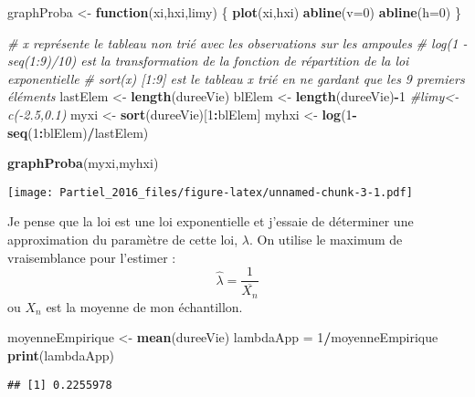 \documentclass[]{article}
\newenvironment{Shaded}{\begin{snugshade}}{\end{snugshade}}
\newcommand{\KeywordTok}[1]{\textcolor[rgb]{0.13,0.29,0.53}{\textbf{#1}}}
\newcommand{\DataTypeTok}[1]{\textcolor[rgb]{0.13,0.29,0.53}{#1}}
\newcommand{\DecValTok}[1]{\textcolor[rgb]{0.00,0.00,0.81}{#1}}
\newcommand{\StringTok}[1]{\textcolor[rgb]{0.31,0.60,0.02}{#1}}
\newcommand{\CommentTok}[1]{\textcolor[rgb]{0.56,0.35,0.01}{\textit{#1}}}
\newcommand{\ControlFlowTok}[1]{\textcolor[rgb]{0.13,0.29,0.53}{\textbf{#1}}}
\newcommand{\OperatorTok}[1]{\textcolor[rgb]{0.81,0.36,0.00}{\textbf{#1}}}
\newcommand{\NormalTok}[1]{#1}
\begin{document}
\begin{Shaded}
\begin{Highlighting}[]
\NormalTok{graphProba <-}\StringTok{ }\ControlFlowTok{function}\NormalTok{(xi,hxi,limy)}
\NormalTok{\{}
  \KeywordTok{plot}\NormalTok{(xi,hxi)}
  \KeywordTok{abline}\NormalTok{(}\DataTypeTok{v=}\DecValTok{0}\NormalTok{)}
  \KeywordTok{abline}\NormalTok{(}\DataTypeTok{h=}\DecValTok{0}\NormalTok{)}
\NormalTok{\}}

\CommentTok{# x représente le tableau non trié avec les observations sur les ampoules}
\CommentTok{# log(1 - seq(1:9)/10) est la transformation de la fonction de répartition de la loi exponentielle}
\CommentTok{# sort(x) [1:9] est le tableau x trié en ne gardant que les 9 premiers éléments}
\NormalTok{lastElem <-}\StringTok{ }\KeywordTok{length}\NormalTok{(dureeVie)}
\NormalTok{blElem <-}\StringTok{ }\KeywordTok{length}\NormalTok{(dureeVie)}\OperatorTok{-}\DecValTok{1}
\CommentTok{#limy<-c(-2.5,0.1)}
\NormalTok{myxi <-}\StringTok{ }\KeywordTok{sort}\NormalTok{(dureeVie)[}\DecValTok{1}\OperatorTok{:}\NormalTok{blElem]}
\NormalTok{myhxi <-}\StringTok{ }\KeywordTok{log}\NormalTok{(}\DecValTok{1}\OperatorTok{-}\KeywordTok{seq}\NormalTok{(}\DecValTok{1}\OperatorTok{:}\NormalTok{blElem)}\OperatorTok{/}\NormalTok{lastElem)}


\KeywordTok{graphProba}\NormalTok{(myxi,myhxi)}
\end{Highlighting}
\end{Shaded}

\texttt{[image: Partiel\_2016\_files/figure-latex/unnamed-chunk-3-1.pdf]}

Je pense que la loi est une loi exponentielle et j'essaie de déterminer
une approximation du paramètre de cette loi, \(\lambda\). On utilise le
maximum de vraisemblance pour l'estimer :\\
\[\widehat{\lambda} = \frac{1}{\overline{X_n}}\] ou \(X_n\) est la
moyenne de mon échantillon.

\begin{Shaded}
\begin{Highlighting}[]
\NormalTok{moyenneEmpirique <-}\StringTok{ }\KeywordTok{mean}\NormalTok{(dureeVie)}
\NormalTok{lambdaApp =}\StringTok{ }\DecValTok{1}\OperatorTok{/}\NormalTok{moyenneEmpirique}
\KeywordTok{print}\NormalTok{(lambdaApp)}
\end{Highlighting}
\end{Shaded}

\begin{verbatim}
## [1] 0.2255978
\end{verbatim}
\end{document}
